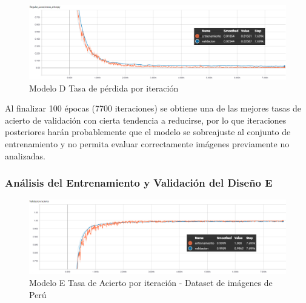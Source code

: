 			\begin{figure}[H]
				\begin{center}
				\includegraphics[width=1\textwidth]{images/desarrollo/trainResults/peru/model6Loss} 
				\end{center}
				\begin{center}
				\caption{\small{Modelo D Tasa de pérdida por iteración}}
				
				{\small{\fontsize{10}{16.8}\selectfont {Fuente: Elaboración propia}}}
				\end{center}
				\vspace{-1.5em}
			\end{figure}

			Al finalizar 100 épocas (7700 iteraciones) se obtiene una de las mejores tasas de acierto de validación con cierta tendencia a reducirse, por lo que iteraciones posteriores harán probablemente que el modelo se sobreajuste al conjunto de entrenamiento y no permita evaluar correctamente imágenes previamente no analizadas.
			

		\subsubsection{Análisis del Entrenamiento y Validación del Diseño E} 
			\begin{figure}[H]
				\begin{center}
				\includegraphics[width=1\textwidth]{images/desarrollo/trainResults/peru/model7Acierto} 
				\end{center}
				\begin{center}
				\caption{\small{Modelo E Tasa de Acierto por iteración - Dataset de imágenes de Perú  }}
				
				{\small{\fontsize{10}{16.8}\selectfont {Fuente: Elaboración propia}}}
				\end{center}
				\vspace{-1.5em}
			\end{figure}
		
